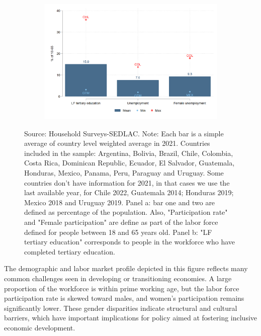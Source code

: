 \documentclass[english]{article}
\begin{document}
\begin{enumerate}
\begin{figure}[h!tbp]
\begin{subfigure}{.9\textwidth}
  \centering
  \includegraphics[width=1\linewidth]{latex/figures/Snapshot/Structure of labor market_b.png}
  \label{fig:labmarket2}
\end{subfigure}

\footnotesize{Source: Household Surveys-SEDLAC.}
\footnotesize{Note: Each bar is a simple average of country level weighted average in 2021. Countries included in the sample: Argentina, Bolivia, Brazil, Chile, Colombia, Costa Rica, Dominican Republic, Ecuador, El Salvador, Guatemala, Honduras, Mexico, Panama, Peru, Paraguay and Uruguay. Some countries don’t have information for 2021, in that cases we use the last available year, for Chile 2022, Guatemala 2014; Honduras 2019; Mexico 2018 and Uruguay 2019. Panel a: bar one and two are defined as percentage of the population. Also, "Participation rate" and "Female participation" are define as part of the labor force defined for people between 18 and 65 years old. Panel b: "LF tertiary education" corresponds to people in the workforce who have completed tertiary education.}

\end{figure}


The demographic and labor market profile depicted in this figure reflects many common challenges seen in developing or transitioning economies. A large proportion of the workforce is within prime working age, but the labor force participation rate is skewed toward males, and women’s participation remains significantly lower. These gender disparities indicate structural and cultural barriers, which have important implications for policy aimed at fostering inclusive economic development.


\end{enumerate}
\end{document}
